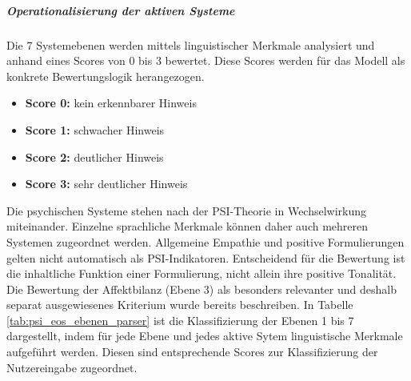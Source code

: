 \subparagraph{Operationalisierung der aktiven Systeme}
Die 7 Systemebenen werden mittels linguistischer Merkmale analysiert und anhand eines Scores von 0 bis 3 bewertet. Diese Scores werden für das Modell als konkrete Bewertungslogik herangezogen.

\begin{itemize}
    \item \textbf{Score 0:} kein erkennbarer Hinweis
    \item \textbf{Score 1:} schwacher Hinweis
    \item \textbf{Score 2:} deutlicher Hinweis
    \item \textbf{Score 3:} sehr deutlicher Hinweis
\end{itemize}

Die psychischen Systeme stehen nach der PSI-Theorie in Wechselwirkung miteinander. Einzelne sprachliche Merkmale können daher auch mehreren Systemen zugeordnet werden.
Allgemeine Empathie und positive Formulierungen gelten nicht automatisch als PSI-Indikatoren. Entscheidend für die Bewertung ist die inhaltliche Funktion einer Formulierung, nicht allein ihre positive Tonalität.
Die Bewertung der Affektbilanz (Ebene 3) als besonders relevanter und deshalb separat ausgewiesenes Kriterium wurde bereits beschreiben. In Tabelle \ref{tab:psi_eos_ebenen_parser} ist die Klassifizierung der Ebenen 1 bis 7 dargestellt, indem für jede Ebene und jedes aktive Sytem linguistische Merkmale aufgeführt werden. Diesen sind entsprechende Scores zur Klassifizierung der Nutzereingabe zugeordnet.


